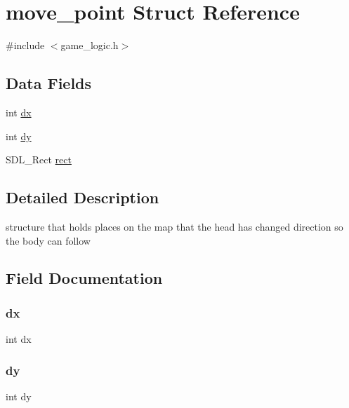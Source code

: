\hypertarget{structmove__point}{}\section{move\+\_\+point Struct Reference}
\label{structmove__point}


{\ttfamily \#include $<$game\+\_\+logic.\+h$>$}

\subsection*{Data Fields}
\begin{DoxyCompactItemize}
\item 
int \mbox{\hyperlink{structmove__point_a6a0d40b2ed6d9e674f93396212f0028f}{dx}}
\item 
int \mbox{\hyperlink{structmove__point_a4817151aee120cc100c400d3076f4b93}{dy}}
\item 
S\+D\+L\+\_\+\+Rect \mbox{\hyperlink{structmove__point_a55aefd071649ac9dd8133e2d8a52d11f}{rect}}
\end{DoxyCompactItemize}


\subsection{Detailed Description}
structure that holds places on the map that the head has changed direction so the body can follow 

\subsection{Field Documentation}
\mbox{\label{structmove__point_a6a0d40b2ed6d9e674f93396212f0028f}} 
\subsubsection{\texorpdfstring{dx}{dx}}
{\footnotesize\ttfamily int dx}

\mbox{\label{structmove__point_a4817151aee120cc100c400d3076f4b93}} 
\subsubsection{\texorpdfstring{dy}{dy}}
{\footnotesize\ttfamily int dy}

